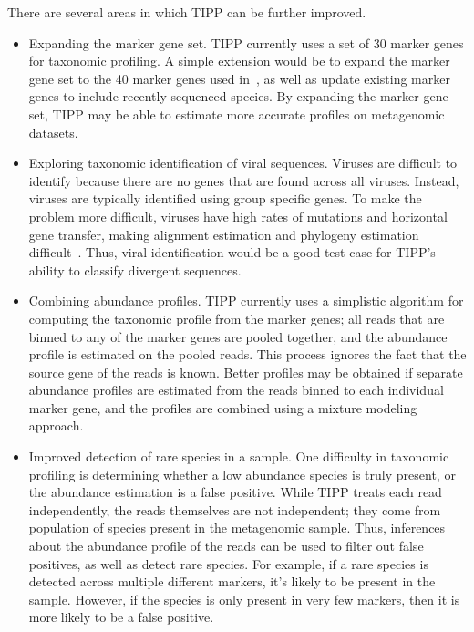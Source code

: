 There are several areas in which TIPP can be further improved.
\begin{itemize}
\item Expanding the marker gene set.  TIPP currently uses a set of 30 marker genes for taxonomic profiling.  A simple extension would be to expand the marker gene set to the 40 marker genes used in~\cite{Sunagawa2013}, as well as update existing marker genes to include recently sequenced species.  By expanding the marker gene set, TIPP may be able to estimate more accurate profiles on metagenomic datasets.  
\item Exploring taxonomic identification of viral sequences.  Viruses are difficult to identify because there are no genes that are found across all viruses.  Instead, viruses are typically identified using group specific genes.  To make the problem more difficult, viruses have high rates of mutations and horizontal gene transfer, making alignment estimation and phylogeny estimation difficult~\cite{todo}.  Thus, viral identification would be a good test case for TIPP's ability to classify divergent sequences.
\item Combining abundance profiles.  TIPP currently uses a simplistic algorithm for computing the taxonomic profile from the marker genes; all reads that are binned to any of the marker genes are pooled together, and the abundance profile is estimated on the pooled reads.  This process ignores the fact that the source gene of the reads is known.  Better profiles may be obtained if separate abundance profiles are estimated from the reads binned to each individual marker gene, and the profiles are combined using a mixture modeling approach.  
\item Improved detection of rare species in a sample.  One difficulty in taxonomic profiling is determining whether a low abundance species is truly present, or the abundance estimation is a false positive.  While TIPP treats each read independently, the reads themselves are not independent; they come from population of species present in the metagenomic sample.  Thus, inferences about the abundance profile of the reads can be used to filter out false positives, as well as detect rare species.  For example, if a rare species is detected across multiple different markers, it's likely to be present in the sample.  However, if the species is only present in very few markers, then it is more likely to be a false positive. 
\end{itemize}


